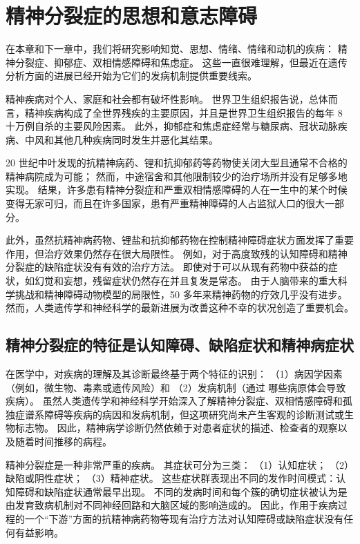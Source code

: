\chapter{精神分裂症的思想和意志障碍} \label{chap:chap60}

在本章和下一章中，我们将研究影响知觉、思想、情绪、情绪和动机的疾病：
精神分裂症、抑郁症、双相情感障碍和焦虑症。
这些一直很难理解，但最近在遗传分析方面的进展已经开始为它们的发病机制提供重要线索。


精神疾病对个人、家庭和社会都有破坏性影响。
世界卫生组织报告说，总体而言，精神疾病构成了全世界残疾的主要原因，并且是世界卫生组织报告的每年 8 十万例自杀的主要风险因素。
此外，抑郁症和焦虑症经常与糖尿病、冠状动脉疾病、中风和其他几种疾病同时发生并恶化其结果。


20 世纪中叶发现的抗精神病药、锂和抗抑郁药等药物使关闭大型且通常不合格的精神病院成为可能；
然而，中途宿舍和其他限制较少的治疗场所并没有足够多地实现。
结果，许多患有精神分裂症和严重双相情感障碍的人在一生中的某个时候变得无家可归，而且在许多国家，患有严重精神障碍的人占监狱人口的很大一部分。


此外，虽然抗精神病药物、锂盐和抗抑郁药物在控制精神障碍症状方面发挥了重要作用，但治疗效果仍然存在很大局限性。
例如，对于高度致残的认知障碍和精神分裂症的缺陷症状没有有效的治疗方法。
即使对于可以从现有药物中获益的症状，如幻觉和妄想，残留症状仍然存在并且复发是常态。
由于人脑带来的重大科学挑战和精神障碍动物模型的局限性，50 多年来精神药物的疗效几乎没有进步。
然而，人类遗传学和神经科学的最新进展为改善这种不幸的状况创造了重要机会。



\section{精神分裂症的特征是认知障碍、缺陷症状和精神病症状}

在医学中，对疾病的理解及其诊断最终基于两个特征的识别：
（1）病因学因素（例如，微生物、毒素或遗传风险）和 
（2）发病机制（通过 哪些病原体会导致疾病）。
虽然人类遗传学和神经科学开始深入了解精神分裂症、双相情感障碍和孤独症谱系障碍等疾病的病因和发病机制，但这项研究尚未产生客观的诊断测试或生物标志物。
因此，精神病学诊断仍然依赖于对患者症状的描述、检查者的观察以及随着时间推移的病程。


精神分裂症是一种非常严重的疾病。
其症状可分为三类：
（1）认知症状； 
（2）缺陷或阴性症状； 
（3）精神症状。
这些症状群表现出不同的发作时间模式：认知障碍和缺陷症状通常最早出现。
不同的发病时间和每个簇的确切症状被认为是由发育致病机制对不同神经回路和大脑区域的影响造成的。
因此，作用于疾病过程的一个“下游”方面的抗精神病药物等现有治疗方法对认知障碍或缺陷症状没有任何有益影响。


